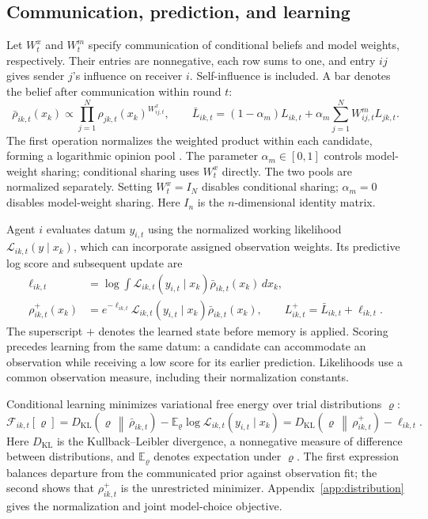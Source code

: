 \documentclass[runningheads]{llncs}
\newcommand{\KL}[2]{D_{\mathrm{KL}}\!\left(#1\,\middle\|\,#2\right)}
\newcommand{\E}{\mathbb E}
\begin{document}
\subsection{Communication, prediction, and learning}
\label{sec:update}
Let $W^x_t$ and $W^m_t$ specify communication of conditional beliefs and model
weights, respectively. Their entries are nonnegative, each row sums to one, and
entry $ij$ gives sender $j$'s influence on receiver $i$. Self-influence is
included. A bar denotes the belief after communication within round $t$:
\begin{equation}
 \bar\rho_{ik,t}(x_k)\propto\prod_{j=1}^N\rho_{jk,t}(x_k)^{W^x_{ij,t}},\qquad
 \bar L_{ik,t}=(1-\alpha_m)L_{ik,t}
       +\alpha_m\sum_{j=1}^N W^m_{ij,t}L_{jk,t}.
 \label{eq:sharing}
\end{equation}
The first operation normalizes the weighted product within each candidate,
forming a logarithmic opinion pool \citep{genest1986}. The parameter
$\alpha_m\in[0,1]$ controls model-weight sharing; conditional sharing uses $W^x_t$
directly. The two pools are normalized separately. Setting $W^x_t=I_N$ disables
conditional sharing; $\alpha_m=0$ disables model-weight sharing. Here $I_n$ is
the $n$-dimensional identity matrix.

Agent $i$ evaluates datum $y_{i,t}$ using the normalized working likelihood
$\mathcal L_{ik,t}(y\mid x_k)$, which can incorporate assigned observation weights.
Its predictive log score and subsequent update are
\begin{align}
 \ell_{ik,t}&=\log\int\mathcal L_{ik,t}(y_{i,t}\mid x_k)
                                \bar\rho_{ik,t}(x_k)\,dx_k,
 \label{eq:score}\\
 \rho^+_{ik,t}(x_k)&=e^{-\ell_{ik,t}}
       \mathcal L_{ik,t}(y_{i,t}\mid x_k)\bar\rho_{ik,t}(x_k),\qquad
 L^+_{ik,t}=\bar L_{ik,t}+\ell_{ik,t}.
 \label{eq:learning}
\end{align}
The superscript $+$ denotes the learned state before memory is applied. Scoring
precedes learning from the same datum: a candidate can accommodate an observation
while receiving a low score for its earlier prediction. Likelihoods use a common
observation measure, including their normalization constants.

Conditional learning minimizes variational free energy over trial distributions
$\varrho$:
\begin{equation}
 \mathcal F_{ik,t}[\varrho]
 =\KL{\varrho}{\bar\rho_{ik,t}}
   -\E_{\varrho}\log\mathcal L_{ik,t}(y_{i,t}\mid x_k)
 =\KL{\varrho}{\rho^+_{ik,t}}-\ell_{ik,t}.
 \label{eq:free-energy}
\end{equation}
Here $D_{\mathrm{KL}}$ is the Kullback--Leibler divergence, a nonnegative measure
of difference between distributions, and $\E_{\varrho}$ denotes expectation under
$\varrho$. The first expression balances departure from the communicated prior
against observation fit; the second shows that $\rho^+_{ik,t}$ is the unrestricted
minimizer. Appendix~\ref{app:distribution} gives the normalization and joint
model-choice objective.
\end{document}
